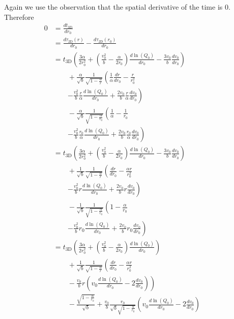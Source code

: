 \documentclass[aps,prl,twocolumn,showpacs,superscriptaddress,groupedaddress]{revtex4-1}  %
\begin{document}
Again we use the observation that the spatial derivative of the time is $0$.  Therefore
\begin{align}
  0 &= \frac{ d t_\text{3D}}{d r_0}\nonumber\\
     &=  \frac{d \tau_\text{2D}(r)}{d r_0} -  \frac{d \tau_\text{2D}(r_0)}{d r_0}\nonumber\\
     &=  t_\text{3D} \left( \frac{3\alpha}{2 r_0^2}  + \left( \frac{v_0^2}{b} - \frac{\alpha}{2 r_0} \right) \frac{d \ln(Q_0)}{d r_0} - \frac{3 v_0}{b}  \frac{d v_0}{dr_0} \right) \nonumber\\
     &\quad\quad + \frac{\alpha}{\sqrt{b}} \frac{1}{\sqrt{1 - \frac{\alpha}{r}}} \left( \frac{1}{\alpha} \frac{d r}{d r_0} - \frac{r}{r_0^2} \right.\nonumber\\
     &\quad\quad \left. - \frac{v_0^2}{b}\frac{r}{\alpha} \frac{d \ln(Q_0)}{d r_0} + \frac{2 v_0}{b}\frac{r}{\alpha} \frac{d v_0}{d r_0}\right)\nonumber\\
     &\quad\quad - \frac{\alpha}{\sqrt{b}} \frac{1}{\sqrt{1 - \frac{\alpha}{r_0}}}  \left( \frac{1}{\alpha} - \frac{1}{r_0} \right.\nonumber\\
     &\quad\quad \left. - \frac{v_0^2}{b}\frac{r_0}{\alpha} \frac{d \ln(Q_0)}{d r_0} + \frac{2 v_0}{b}\frac{r_0}{\alpha} \frac{d v_0}{d r_0}\right)\nonumber\\
     &=  t_\text{3D} \left( \frac{3\alpha}{2 r_0^2}  + \left( \frac{v_0^2}{b} - \frac{\alpha}{2 r_0} \right) \frac{d \ln(Q_0)}{d r_0} - \frac{3 v_0}{b}  \frac{d v_0}{dr_0} \right) \nonumber\\
     &\quad\quad + \frac{1}{\sqrt{b}} \frac{1}{\sqrt{1 - \frac{\alpha}{r}}} \left( \frac{d r}{d r_0} - \frac{\alpha r}{r_0^2} \right.\nonumber\\
     &\quad\quad \left.- \frac{v_0^2}{b} r \frac{d \ln(Q_0)}{d r_0} + \frac{2 v_0}{b} r \frac{d v_0}{d r_0} \right)\nonumber\\
     &\quad\quad - \frac{1}{\sqrt{b}} \frac{1}{\sqrt{1 - \frac{\alpha}{r_0}}}  \left(1 - \frac{\alpha}{r_0} \right.\nonumber\\
     &\quad\quad \left. - \frac{v_0^2}{b} r_0 \frac{d \ln(Q_0)}{d r_0} + \frac{2 v_0}{b}r_0 \frac{d v_0}{d r_0}\right)\nonumber\\
     &=  t_\text{3D} \left( \frac{3\alpha}{2 r_0^2}  + \left( \frac{v_0^2}{b} - \frac{\alpha}{2 r_0} \right) \frac{d \ln(Q_0)}{d r_0}\right) \nonumber\\
     &\quad\quad + \frac{1}{\sqrt{b}} \frac{1}{\sqrt{1 - \frac{\alpha}{r}}} \left( \frac{d r}{d r_0} - \frac{\alpha r}{r_0^2} \right.\nonumber\\
     &\quad\quad - \left. \frac{v_0}{b} r \left(v_0 \frac{d \ln(Q_0) }{d r_0} - 2 \frac{d v_0}{d r_0}\right) \right)\nonumber\\
     &\quad\quad - \frac{\sqrt{1 - \frac{\alpha}{r_0}}}{\sqrt{b}} + \frac{v_0}{b}\frac{r_0}{\sqrt{b}\sqrt{1 - \frac{\alpha}{r_0}}} \left( v_0 \frac{d \ln(Q_0)}{d r_0} - 2 \frac{d v_0}{d r_0}\right)
     &\quad\quad 
\end{align}
\end{document}
